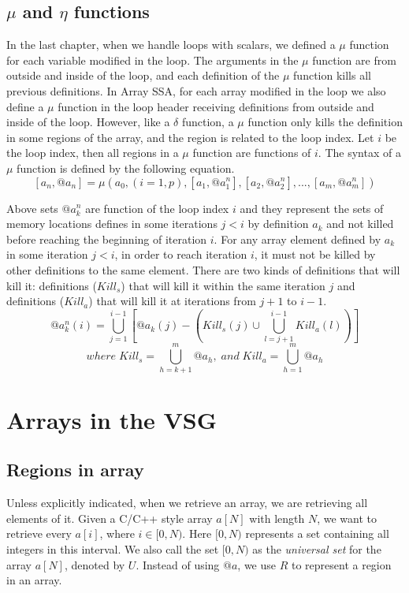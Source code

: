 \documentclass[12pt]{gatech-thesis}
\begin{document}
\subsection{$\mu$ and $\eta$ functions}

In the last chapter, when we handle loops with scalars, we defined a $\mu$ function for each variable modified in the loop. The arguments in the $\mu$ function are from outside and inside of the loop, and each definition of the $\mu$ function kills all previous definitions. In Array SSA,  for each array modified in the loop we also define a $\mu$ function in the loop header receiving definitions from outside and inside of the loop. However, like a $\delta$ function, a $\mu$ function only kills the definition in some regions of the array, and the region is related to the loop index. Let $i$ be the loop index, then all regions in a $\mu$ function are functions of $i$. The syntax of a $\mu$ function is defined by the following equation.
 $$[a_n, @a_n] = \mu(a_0, (i=1,p), [a_1, @a_1^n], [a_2, @a_2^n],  ... , [a_m, @a_m^n] )$$

Above sets $@a_k^n$ are function of the loop index $i$ and they represent the sets of memory locations defines in some iterations $j<i$ by definition $a_k$ and not killed before reaching the beginning of iteration $i$. 
For any array element defined by $a_k$ in some iteration $j < i$, in order to reach iteration $i$, it must not be killed by other definitions to the same element. 
There are two kinds of definitions that will kill it: definitions ($Kill_s$) that will kill it within the same iteration $j$ and definitions ($Kill_a$) that will kill it at iterations from $j +1$ to $i-1$.
 $$@a_k^n(i)=\bigcup_{j=1}^{i-1}\left[@a_k(j)-\left(Kill_s(j) \cup \bigcup_{l=j+1}^{i-1}Kill_a(l)\right)\right]$$
 $$ where \; Kill_s = \bigcup_{h=k+1}^m @a_h, \; and \; Kill_a=\bigcup_{h=1}^m@a_h$$

\section{Arrays in the VSG}

\subsection{Regions in array}

Unless explicitly indicated, when we retrieve an array, we are retrieving all elements of it. 
Given a C/C++ style array $a[N]$ with length $N$, we want to retrieve every $a[i]$, where $i\in[0,N)$. Here $[0,N)$ represents a set containing all integers in this interval. 
We also call the set $[0,N)$ as the \emph{universal set} for the array $a[N]$, denoted by $U$. 
Instead of using $@a$, we use $R$ to represent a region in an array. 
\end{document}
